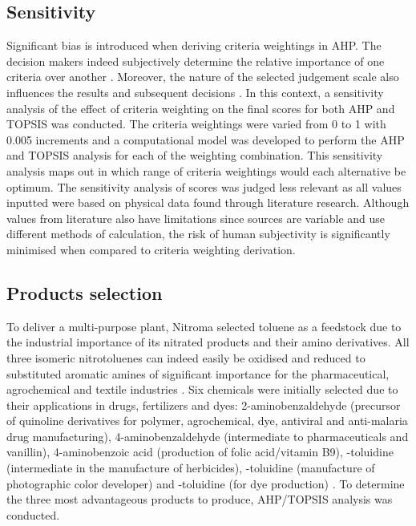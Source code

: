 \subsection{Sensitivity} %

Significant bias is introduced when deriving criteria weightings in AHP. The decision makers indeed subjectively determine the relative importance of one criteria over another \cite{triantaphyllou_sensitivity_1997}. Moreover, the nature of the selected judgement scale also influences the results and subsequent decisions \cite{franek_judgment_2014}. In this context, a sensitivity analysis of the effect of criteria weighting on the final scores for both AHP and TOPSIS was conducted. The criteria weightings were varied from 0 to 1 with 0.005 increments and a computational model was developed to perform the AHP and TOPSIS analysis for each of the weighting combination. This sensitivity analysis maps out in which range of criteria weightings would each alternative be optimum. The sensitivity analysis of scores was judged less relevant as all values inputted were based on physical data found through literature research. Although values from literature also have limitations since sources are variable and use different methods of calculation, the risk of human subjectivity is significantly minimised when compared to criteria weighting derivation.


\subsection{Products selection}

To deliver a multi-purpose plant, Nitroma selected toluene as a feedstock due to the industrial importance of its nitrated products and their amino derivatives. All three isomeric nitrotoluenes can indeed easily be oxidised and reduced to substituted aromatic amines of significant importance for the pharmaceutical, agrochemical and textile industries \cite{dugal_nitrobenzene_2005}. Six chemicals were initially selected due to their applications in drugs, fertilizers and dyes: 2-aminobenzaldehyde (precursor of quinoline derivatives for polymer, agrochemical, dye, antiviral and anti-malaria drug manufacturing), 4-aminobenzaldehyde (intermediate to pharmaceuticals and vanillin), 4-aminobenzoic acid (production of folic acid/vitamin B9), \ortho-toluidine (intermediate in the manufacture of herbicides), \meta-toluidine (manufacture of  photographic color developer) and \para-toluidine (for dye production) \cite{bowers_toluidines_2000,bruhne_benzaldehyde_2011,maki_benzoic_2000}. To determine the three most advantageous products to produce, AHP/TOPSIS analysis was conducted.

